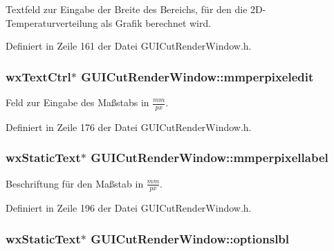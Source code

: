 Textfeld zur Eingabe der Breite des Bereichs, für den die 2\-D-\/\-Temperaturverteilung als Grafik berechnet wird. 



Definiert in Zeile 161 der Datei G\-U\-I\-Cut\-Render\-Window.\-h.

\hypertarget{classGUICutRenderWindow_a76ced7f0bb7a2b08142aaf225f37c108}{
\subsubsection[{mmperpixeledit}]{\setlength{\rightskip}{0pt plus 5cm}wx\-Text\-Ctrl$\ast$ G\-U\-I\-Cut\-Render\-Window\-::mmperpixeledit\hspace{0.3cm}{\ttfamily [private]}}}\label{classGUICutRenderWindow_a76ced7f0bb7a2b08142aaf225f37c108}


Feld zur Eingabe des Maßstabs in $\frac{mm}{px}$. 



Definiert in Zeile 176 der Datei G\-U\-I\-Cut\-Render\-Window.\-h.

\hypertarget{classGUICutRenderWindow_ab1f4863c699e72e54e8b3f6d320a5e3a}{
\subsubsection[{mmperpixellabel}]{\setlength{\rightskip}{0pt plus 5cm}wx\-Static\-Text$\ast$ G\-U\-I\-Cut\-Render\-Window\-::mmperpixellabel\hspace{0.3cm}{\ttfamily [private]}}}\label{classGUICutRenderWindow_ab1f4863c699e72e54e8b3f6d320a5e3a}


Beschriftung für den Maßstab in $\frac{mm}{px}$. 



Definiert in Zeile 196 der Datei G\-U\-I\-Cut\-Render\-Window.\-h.

\hypertarget{classGUICutRenderWindow_a3317d0e8526d4a11168e86f673576ee3}{
\subsubsection[{optionslbl}]{\setlength{\rightskip}{0pt plus 5cm}wx\-Static\-Text$\ast$ G\-U\-I\-Cut\-Render\-Window\-::optionslbl\hspace{0.3cm}{\ttfamily [private]}}}\label{classGUICutRenderWindow_a3317d0e8526d4a11168e86f673576ee3}


